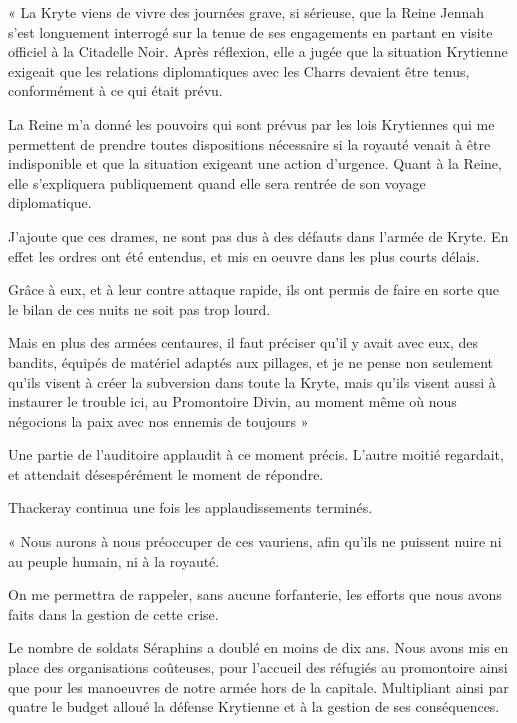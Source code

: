 \documentclass{book}
\begin{document}
« La Kryte viens de vivre des journées grave, si sérieuse, que la Reine Jennah s'est longuement interrogé sur la tenue de ses engagements en partant en visite officiel à la Citadelle Noir. Après réflexion, elle a jugée que la situation Krytienne exigeait que les relations diplomatiques avec les Charrs devaient être tenus, conformément à ce qui était prévu.

La Reine m'a donné les pouvoirs qui sont prévus par les lois Krytiennes qui me permettent de prendre toutes dispositions nécessaire si la royauté venait à être indisponible et que la situation exigeant une action d'urgence. Quant à la Reine, elle s'expliquera publiquement quand elle sera rentrée de son voyage diplomatique.

J'ajoute que ces drames, ne sont pas dus à des défauts dans l'armée de Kryte. En effet les ordres ont été entendus, et mis en oeuvre dans les plus courts délais.

Grâce à eux, et à leur contre attaque rapide, ils ont permis de faire en sorte que le bilan de ces nuits ne soit pas trop lourd.

Mais en plus des armées centaures, il faut préciser qu'il y avait avec eux, des bandits, équipés de matériel adaptés aux pillages, et je ne pense non seulement qu'ils visent à créer la subversion dans toute la Kryte, mais qu'ils visent aussi à instaurer le trouble ici, au Promontoire Divin, au moment même où nous négocions la paix avec nos ennemis de toujours  »\newline

Une partie de l'auditoire applaudit à ce moment précis. L'autre moitié regardait, et attendait désespérément le moment de répondre.\newline

Thackeray continua une fois les applaudissements terminés.\newline

« Nous aurons à nous préoccuper de ces vauriens, afin qu'ils ne puissent nuire ni au peuple humain, ni à la royauté.

On me permettra de rappeler, sans aucune forfanterie, les efforts que nous avons faits dans la gestion de cette crise.

Le nombre de soldats Séraphins a doublé en moins de dix ans. Nous avons mis en place des organisations coûteuses, pour l'accueil des réfugiés au promontoire ainsi que pour les manoeuvres de notre armée hors de la capitale. Multipliant ainsi par quatre le budget alloué la défense Krytienne et à la gestion de ses conséquences.
\end{document}

